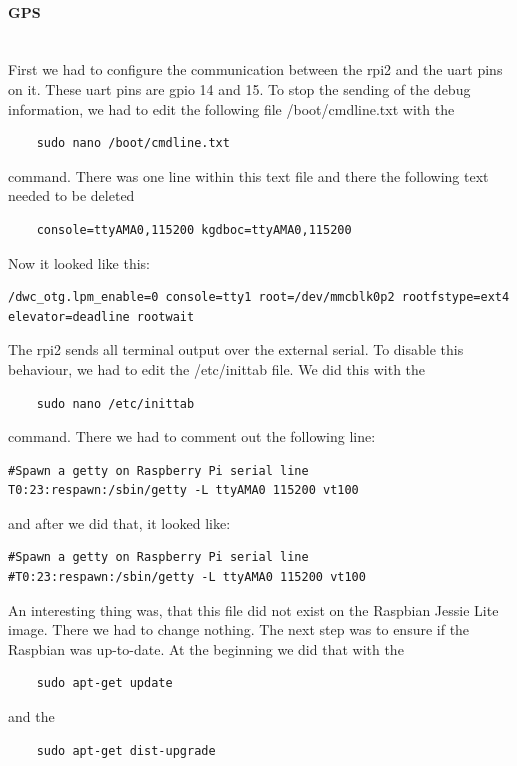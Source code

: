 \paragraph{GPS} \mbox{}\\
First we had to configure the communication between the \gls{rpi2} and the \gls{uart} pins on it. These \gls{uart} pins are \gls{gpio} 14 and 15.\newline
To stop the sending of the debug information, we had to edit the following file /boot/cmdline.txt with the 
\begin{verbatim}
	sudo nano /boot/cmdline.txt
\end{verbatim}
command.\newline
There was one line within this text file and there the following text needed to be deleted
\begin{verbatim}
	console=ttyAMA0,115200 kgdboc=ttyAMA0,115200
\end{verbatim}
Now it looked like this: 
\begin{verbatim}
/dwc_otg.lpm_enable=0 console=tty1 root=/dev/mmcblk0p2 rootfstype=ext4 
elevator=deadline rootwait
\end{verbatim}
The \gls{rpi2} sends all terminal output over the external serial. To disable this behaviour, we had to edit the /etc/inittab file. We did this with the 
\begin{verbatim}
	sudo nano /etc/inittab
\end{verbatim}
command.\newline
There we had to comment out the following line:
\begin{verbatim}
#Spawn a getty on Raspberry Pi serial line
T0:23:respawn:/sbin/getty -L ttyAMA0 115200 vt100
\end{verbatim}
and after we did that, it looked like:
\begin{verbatim}
#Spawn a getty on Raspberry Pi serial line
#T0:23:respawn:/sbin/getty -L ttyAMA0 115200 vt100
\end{verbatim}
An interesting thing was, that this file did not exist on the Raspbian Jessie Lite image. There we had to change nothing.\newline
The next step was to ensure if the Raspbian was up-to-date. At the beginning we did that with the 
\begin{verbatim}
	sudo apt-get update
\end{verbatim}
and the 
\begin{verbatim}
	sudo apt-get dist-upgrade
\end{verbatim}
